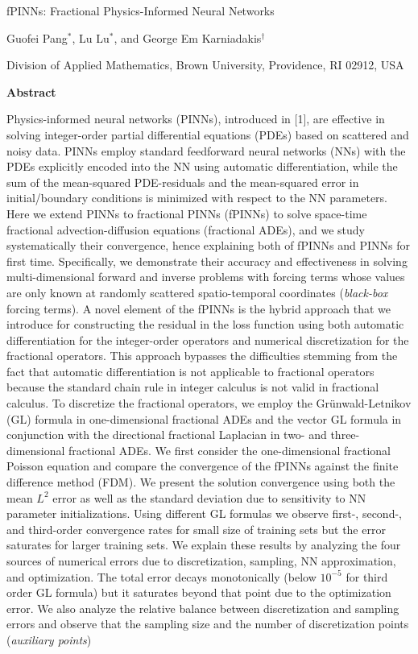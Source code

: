 \documentclass[UTF8]{article}
\begin{document}
\begin{center}
{\LARGE fPINNs: Fractional Physics-Informed Neural Networks}

\vspace{0.5cm}
Guofei Pang$^*$, Lu Lu$^*$, and George Em Karniadakis$^\dagger$

\vspace{0.2cm}
Division of Applied Mathematics, Brown University, Providence, RI 02912, USA
\end{center}

\vspace{0.5cm}
\textbf{Abstract}

Physics-informed neural networks (PINNs), introduced in [1], are effective in solving integer-order partial differential equations (PDEs) based on scattered and noisy data. PINNs employ standard feedforward neural networks (NNs) with the PDEs explicitly encoded into the NN using automatic differentiation, while the sum of the mean-squared PDE-residuals and the mean-squared error in initial/boundary conditions is minimized with respect to the NN parameters. Here we extend PINNs to fractional PINNs (fPINNs) to solve space-time fractional advection-diffusion equations (fractional ADEs), and we study systematically their convergence, hence explaining both of fPINNs and PINNs for first time. Specifically, we demonstrate their accuracy and effectiveness in solving multi-dimensional forward and inverse problems with forcing terms whose values are only known at randomly scattered spatio-temporal coordinates (\textit{black-box} forcing terms). A novel element of the fPINNs is the hybrid approach that we introduce for constructing the residual in the loss function using both automatic differentiation for the integer-order operators and numerical discretization for the fractional operators. This approach bypasses the difficulties stemming from the fact that automatic differentiation is not applicable to fractional operators because the standard chain rule in integer calculus is not valid in fractional calculus. To discretize the fractional operators, we employ the Grünwald-Letnikov (GL) formula in one-dimensional fractional ADEs and the vector GL formula in conjunction with the directional fractional Laplacian in two- and three-dimensional fractional ADEs. We first consider the one-dimensional fractional Poisson equation and compare the convergence of the fPINNs against the finite difference method (FDM). We present the solution convergence using both the mean $L^2$ error as well as the standard deviation due to sensitivity to NN parameter initializations. Using different GL formulas we observe first-, second-, and third-order convergence rates for small size of training sets but the error saturates for larger training sets. We explain these results by analyzing the four sources of numerical errors due to discretization, sampling, NN approximation, and optimization. The total error decays monotonically (below $10^{-5}$ for third order GL formula) but it saturates beyond that point due to the optimization error. We also analyze the relative balance between discretization and sampling errors and observe that the sampling size and the number of discretization points (\textit{auxiliary points}) 
\end{document}
